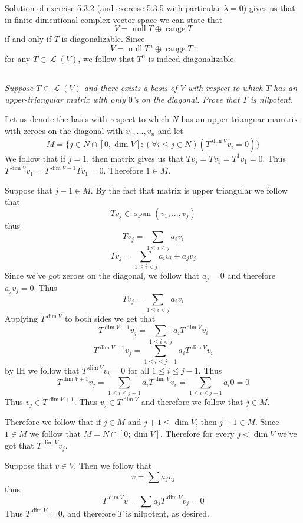 \documentclass[11pt,oneside,titlepage]{book}
\DeclareMathOperator \map {\mathcal {L}}
\DeclareMathOperator \ns {null}
\DeclareMathOperator \range {range}
\DeclareMathOperator \Span {span}
\begin{document}
Solution of exercise 5.3.2 (and exercise 5.3.5 with particular $\lambda = 0$)
gives us that in finite-dimentional complex vector space we can state that
$$V = \ns T \oplus \range T$$
if and only if $T$ is diagonalizable. Since
$$V = \ns T^n \oplus \range T^n$$
for any $T \in \map(V)$, we follow that $T^n$ is indeed diagonalizable.

\subsection{}

\textit{Suppose $T \in \map(V)$ and there exists a basis of $V$ with respect to
  which $T$ has an upper-triangular matrix with only $0$'s on the diagonal. Prove that
  $T$ is nilpotent.}

Let us denote the  basis with respect to which $N$ has an upper
trianguar mamtrix with zeroes on the diagonal with $v_1, ..., v_n$ and let
$$M = \{j \in N \cap [0, \dim V] : (\forall i \leq j \in N)(T^{\dim V} v_i  = 0)\}$$
We follow that if $j = 1$, then matrix gives us that $T v_j = T v_1 = T^1 v_1 =  0$.
Thus $T^{\dim V} v_1 = T^{\dim V - 1} T v_1 = 0$.  Therefore $1 \in M$.

Suppose that $j - 1 \in M$. By the fact that matrix is upper triangular we follow that
$$T v_j \in \Span(v_1, ..., v_j)$$
thus
$$T v_j = \sum_{1 \leq i \leq j} {a_i v_i}$$
$$T v_j = \sum_{1 \leq i < j} {a_i v_i} + a_j v_j$$
Since we've got zeroes on the diagonal, we follow that $a_j = 0$ and therefore $a_j v_j = 0$. Thus 
$$T v_j = \sum_{1 \leq i < j} {a_i v_i}$$
Applying $T^{ \dim V}$ to both sides we get that
$$T^{\dim V + 1} v_j = \sum_{1 \leq i < j} {a_i T^{\dim V}v_i}$$
$$T^{\dim V + 1} v_j = \sum_{1 \leq i \leq j - 1} {a_i T^{\dim V}v_i}$$
by IH we follow that $T^{\dim V}v_i = 0$  for all $1 \leq i \leq j - 1$. Thus
$$T^{\dim V + 1} v_j = \sum_{1 \leq i \leq j - 1} {a_i T^{\dim V}v_i} =
\sum_{1 \leq i \leq j - 1} {a_i 0} = 0$$
Thus $v_j \in T^{\dim V + 1}$. Thus $v_j \in T^{\dim V}$ and therefore we follow that $j \in M$.

Therefore we follow that if $j \in M$ and $j + 1 \leq \dim V$, then $j + 1 \in M$. Since
$1 \in M$ we follow that $M = N \cap [0; \dim V]$. Therefore for every $j < \dim V$ we've
got that $T^{\dim V} v_j$.

Suppose that $v \in V$. Then we follow that
$$v = \sum a_j v_j$$
thus
$$T^{\dim V}v = \sum a_j T^{\dim V}v_j = 0 $$
Thus $T^{\dim V} = 0$, and therefore  $T$ is nilpotent, as desired.

\subsection{}
\end{document}
